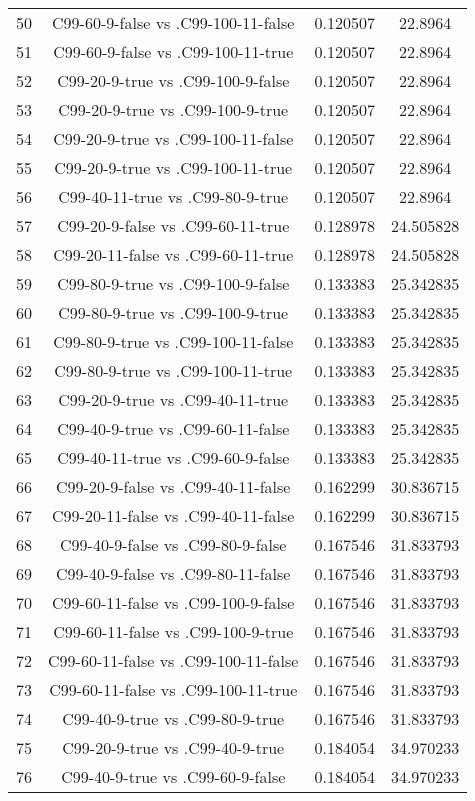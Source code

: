 \documentclass[a4paper,10pt]{article}
\begin{document}
\begin{landscape}
\begin{table}[!htp]
\begin{tabular}{cccc}
50&C99-60-9-false vs .C99-100-11-false&0.120507&22.8964\\
51&C99-60-9-false vs .C99-100-11-true&0.120507&22.8964\\
52&C99-20-9-true vs .C99-100-9-false&0.120507&22.8964\\
53&C99-20-9-true vs .C99-100-9-true&0.120507&22.8964\\
54&C99-20-9-true vs .C99-100-11-false&0.120507&22.8964\\
55&C99-20-9-true vs .C99-100-11-true&0.120507&22.8964\\
56&C99-40-11-true vs .C99-80-9-true&0.120507&22.8964\\
57&C99-20-9-false vs .C99-60-11-true&0.128978&24.505828\\
58&C99-20-11-false vs .C99-60-11-true&0.128978&24.505828\\
59&C99-80-9-true vs .C99-100-9-false&0.133383&25.342835\\
60&C99-80-9-true vs .C99-100-9-true&0.133383&25.342835\\
61&C99-80-9-true vs .C99-100-11-false&0.133383&25.342835\\
62&C99-80-9-true vs .C99-100-11-true&0.133383&25.342835\\
63&C99-20-9-true vs .C99-40-11-true&0.133383&25.342835\\
64&C99-40-9-true vs .C99-60-11-false&0.133383&25.342835\\
65&C99-40-11-true vs .C99-60-9-false&0.133383&25.342835\\
66&C99-20-9-false vs .C99-40-11-false&0.162299&30.836715\\
67&C99-20-11-false vs .C99-40-11-false&0.162299&30.836715\\
68&C99-40-9-false vs .C99-80-9-false&0.167546&31.833793\\
69&C99-40-9-false vs .C99-80-11-false&0.167546&31.833793\\
70&C99-60-11-false vs .C99-100-9-false&0.167546&31.833793\\
71&C99-60-11-false vs .C99-100-9-true&0.167546&31.833793\\
72&C99-60-11-false vs .C99-100-11-false&0.167546&31.833793\\
73&C99-60-11-false vs .C99-100-11-true&0.167546&31.833793\\
74&C99-40-9-true vs .C99-80-9-true&0.167546&31.833793\\
75&C99-20-9-true vs .C99-40-9-true&0.184054&34.970233\\
76&C99-40-9-true vs .C99-60-9-false&0.184054&34.970233\\

\end{tabular}
\end{table}
\end{landscape}
\end{document}
